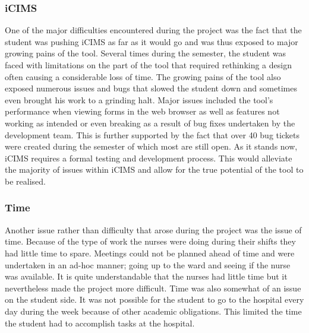 \subsubsection{iCIMS}
One of the major difficulties encountered during the project was the fact that the student was pushing iCIMS as far as it would go and was thus exposed to major growing pains of the tool. Several times during the semester, the student was faced with limitations on the part of the tool that required rethinking a design often causing a considerable loss of time. The growing pains of the tool also exposed numerous issues and bugs that slowed the student down and sometimes even brought his work to a grinding halt. Major issues included the tool's performance when viewing forms in the web browser as well as features not working as intended or even breaking as a result of bug fixes undertaken by the development team. This is further supported by the fact that over 40 bug tickets were created during the semester of which most are still open. As it stands now, iCIMS requires a formal testing and development process. This would alleviate the majority of issues within iCIMS and allow for the true potential of the tool to be realised. 

\subsubsection{Time}
Another issue rather than difficulty that arose during the project was the issue of time. Because of the type of work the nurses were doing during their shifts they had little time to spare. Meetings could not be planned ahead of time and were undertaken in an ad-hoc manner; going up to the ward and seeing if the nurse was available. It is quite understandable that the nurses had little time but it nevertheless made the project more difficult. Time was also somewhat of an issue on the student side. It was not possible for the student to go to the hospital every day during the week because of other academic obligations. This limited the time the student had to accomplish tasks at the hospital.

